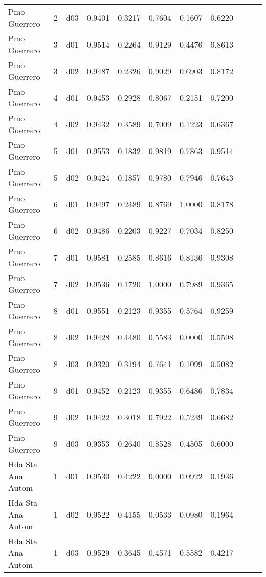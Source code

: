 \begin{landscape}
\begin{longtable}{p{5cm}rrrrrrrrrr}
         Pmo Guerrero  & 2 &     d03 &   0.9401 &  0.3217 &    0.7604 &   0.1607 &    0.6220 \\
         Pmo Guerrero  & 3 &     d01 &   0.9514 &  0.2264 &    0.9129 &   0.4476 &    0.8613 \\
         Pmo Guerrero  & 3 &     d02 &   0.9487 &  0.2326 &    0.9029 &   0.6903 &    0.8172 \\
         Pmo Guerrero  & 4 &     d01 &   0.9453 &  0.2928 &    0.8067 &   0.2151 &    0.7200 \\
         Pmo Guerrero  & 4 &     d02 &   0.9432 &  0.3589 &    0.7009 &   0.1223 &    0.6367 \\
         Pmo Guerrero  & 5 &     d01 &   0.9553 &  0.1832 &    0.9819 &   0.7863 &    0.9514 \\
         Pmo Guerrero  & 5 &     d02 &   0.9424 &  0.1857 &    0.9780 &   0.7946 &    0.7643 \\
         Pmo Guerrero  & 6 &     d01 &   0.9497 &  0.2489 &    0.8769 &   1.0000 &    0.8178 \\
         Pmo Guerrero  & 6 &     d02 &   0.9486 &  0.2203 &    0.9227 &   0.7034 &    0.8250 \\
         Pmo Guerrero  & 7 &     d01 &   0.9581 &  0.2585 &    0.8616 &   0.8136 &    0.9308 \\
         Pmo Guerrero  & 7 &     d02 &   0.9536 &  0.1720 &    1.0000 &   0.7989 &    0.9365 \\
         Pmo Guerrero  & 8 &     d01 &   0.9551 &  0.2123 &    0.9355 &   0.5764 &    0.9259 \\
         Pmo Guerrero  & 8 &     d02 &   0.9428 &  0.4480 &    0.5583 &   0.0000 &    0.5598 \\
         Pmo Guerrero  & 8 &     d03 &   0.9320 &  0.3194 &    0.7641 &   0.1099 &    0.5082 \\
         Pmo Guerrero  & 9 &     d01 &   0.9452 &  0.2123 &    0.9355 &   0.6486 &    0.7834 \\
         Pmo Guerrero  & 9 &     d02 &   0.9422 &  0.3018 &    0.7922 &   0.5239 &    0.6682 \\
         Pmo Guerrero  & 9 &     d03 &   0.9353 &  0.2640 &    0.8528 &   0.4505 &    0.6000 \\
    Hda Sta Ana Autom  & 1 &     d01 &   0.9530 &  0.4222 &    0.0000 &   0.0922 &    0.1936 \\
    Hda Sta Ana Autom  & 1 &     d02 &   0.9522 &  0.4155 &    0.0533 &   0.0980 &    0.1964 \\
    Hda Sta Ana Autom  & 1 &     d03 &   0.9529 &  0.3645 &    0.4571 &   0.5582 &    0.4217 \\

\end{longtable}
\end{landscape}
